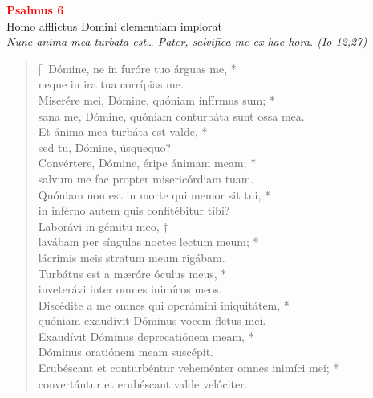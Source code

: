 


\def\greinitialformat#1{%
{\fontsize{39}{39}\selectfont #1}%
}




\vspace{0.3cm}
\begin{center}
 \textcolor{red}{\large \bf Psalmus 6}\\
Homo afflictus Domini clementiam implorat\\
\textit{\small Nunc anima mea turbata est… Pater, salvifica me ex hac hora. (Io 12,27)}
\end{center}
\begin{verse}[\versewidth]
Dómine, ne in furóre tuo árguas me, *\\
neque in ira tua corrípias me.\\
\vin Miserére mei, Dómine, quóniam infírmus sum; *\\
\vin sana me, Dómine, quóniam conturbáta sunt ossa mea.\\
Et ánima mea turbáta est valde, *\\
sed tu, Dómine, úsquequo?\\
\vin Convértere, Dómine, éripe ánimam meam; *\\
\vin salvum me fac propter misericórdiam tuam.\\
Quóniam non est in morte qui memor sit tui, *\\
in inférno autem quis confitébitur tibi?\\
\vin Laborávi in gémitu meo, †\\
\vin lavábam per síngulas noctes lectum meum; *\\
\vin lácrimis meis stratum meum rigábam.\\
Turbátus est a mæróre óculus meus, *\\
inveterávi inter omnes inimícos meos.\\
\vin Discédite a me omnes qui operámini iniquitátem, *\\
\vin quóniam exaudívit Dóminus vocem fletus mei.\\
Exaudívit Dóminus deprecatiónem meam, *\\
Dóminus oratiónem meam suscépit.\\
\vin Erubéscant et \verselinebreak conturbéntur veheménter omnes inimíci mei; *\\
\vin convertántur et erubéscant valde velóciter.\\
\end{verse}
\vspace{1cm}


